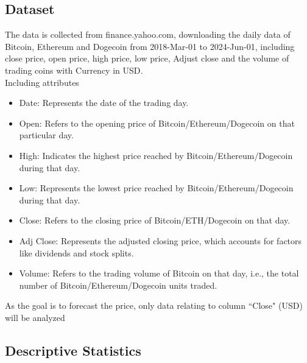 \documentclass{ieeeojies}
\begin{document}
\subsection{Dataset}
The data is collected from finance.yahoo.com, downloading the daily data of Bitcoin, Ethereum and Dogecoin from 2018-Mar-01 to 2024-Jun-01, including close price, open price, high price, low price, Adjust close and the  volume of trading coins with Currency in USD. \\
Including attributes
\begin{itemize}
    \raggedright
    \item Date: Represents the date of the trading day.
    \item Open: Refers to the opening price of Bitcoin/Ethereum/Dogecoin on that particular day.
    \item High: Indicates the highest price reached by Bitcoin/Ethereum/Dogecoin during that day.
    \item Low: Represents the lowest price reached by Bitcoin/Ethereum/Dogecoin during that day.
    \item Close: Refers to the closing price of Bitcoin/ETH/Dogecoin on that day.
    \item Adj Close: Represents the adjusted closing price, which accounts for factors like dividends and stock splits.
    \item Volume: Refers to the trading volume of Bitcoin on that day, i.e., the total number of Bitcoin/Ethereum/Dogecoin units traded.
\end{itemize}
As the goal is to forecast the price, only data relating to column “Close"
(USD) will be analyzed

\subsection{Descriptive Statistics}
\end{document}
